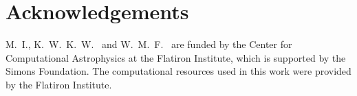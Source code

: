 \documentclass[aps,prd,twocolumn,superscriptaddress,preprintnumbers,floatfix,nofootinbib]{revtex4-2}
\begin{document}
\section{Acknowledgements}
\label{sec:Acknowledgements}
M.~I., K.~W.~K.~W.~ and W.~M.~F.~ are funded by the Center for Computational Astrophysics at the Flatiron Institute, which is supported by the Simons Foundation.
The computational resources used in this work were provided by the Flatiron Institute.


\end{document}
